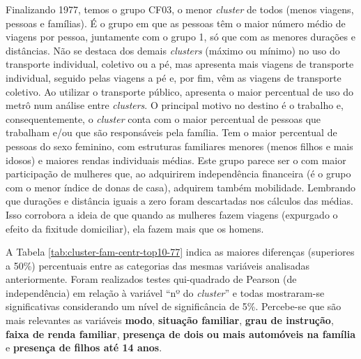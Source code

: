 Finalizando 1977, temos o grupo CF03, o menor \textit{cluster} de todos (menos viagens, pessoas e famílias).
É o grupo em que as pessoas têm o maior número médio de viagens por pessoa, juntamente com o grupo 1, só que com as menores durações e distâncias.
Não se destaca dos demais \textit{clusters} (máximo ou mínimo) no uso do transporte individual, coletivo ou a pé, mas apresenta mais viagens de transporte individual, seguido pelas viagens a pé e, por fim, vêm as viagens de transporte coletivo.
Ao utilizar o transporte público, apresenta o maior percentual de uso do metrô num análise entre \textit{clusters}.
O principal motivo no destino é o trabalho e, consequentemente, o \textit{cluster} conta com o maior percentual de pessoas que trabalham e/ou que são responsáveis pela família.
Tem o maior percentual de pessoas do sexo feminino, com estruturas familiares menores (menos filhos e mais idosos) e maiores rendas individuais médias.
Este grupo parece ser o com maior participação de mulheres que, ao adquirirem independência financeira (é o grupo com o menor índice de donas de casa), adquirem também mobilidade.
Lembrando que durações e distância iguais a zero foram descartadas nos cálculos das médias. Isso corrobora a ideia de que quando as mulheres fazem viagens (expurgado o efeito da fixitude domiciliar), ela fazem mais que os homens.

A Tabela \ref{tab:cluster-fam-centr-top10-77} indica as maiores diferenças (superiores a 50\%) percentuais entre as categorias das mesmas variáveis analisadas anteriormente.
Foram realizados testes qui-quadrado de Pearson (de independência) em relação à variável ``nº do \textit{cluster}'' e todas mostraram-se significativas considerando um nível de significância de 5\%. 
Percebe-se que são mais relevantes as variáveis \textbf{modo}, \textbf{situação familiar}, \textbf{grau de instrução}, \textbf{faixa de renda familiar}, \textbf{presença de dois ou mais automóveis na família} e \textbf{presença de filhos até 14 anos}.

